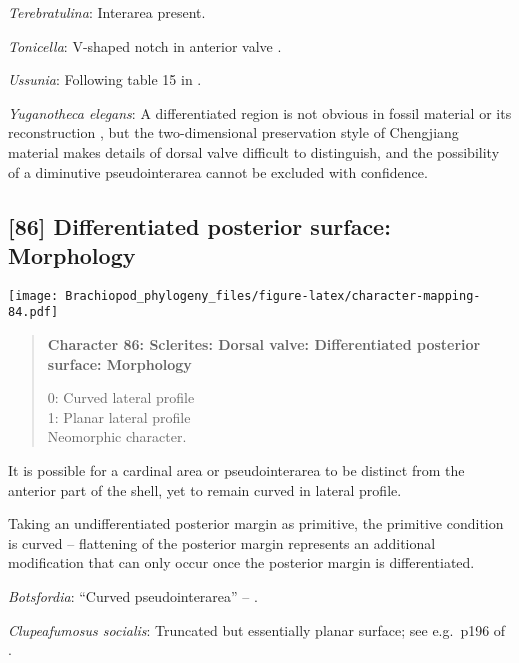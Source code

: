 \documentclass[openany]{book}
\theoremstyle{definition}
\theoremstyle{definition}
\theoremstyle{definition}
\theoremstyle{remark}
\begin{document}
\hypertarget{Terebratulina-coding-85}{}
\emph{Terebratulina}: Interarea present.

\hypertarget{Tonicella-coding-85}{}
\emph{Tonicella}: V-shaped notch in anterior valve \citep{Schwabe2010}.

\hypertarget{Ussunia-coding-85}{}
\emph{Ussunia}: Following table 15 in
\citet{Williams2000LinguliformeaCraniiformea}.

\hypertarget{Yuganotheca_elegans-coding-85}{}
\emph{Yuganotheca elegans}: A differentiated region is not obvious in
fossil material or its reconstruction \citep{Zhang2014Anearly}, but the
two-dimensional preservation style of Chengjiang material makes details
of dorsal valve difficult to distinguish, and the possibility of a
diminutive pseudointerarea cannot be excluded with confidence.

\subsection*{{[}86{]} Differentiated posterior surface:
Morphology}\label{differentiated-posterior-surface-morphology}

\texttt{[image: Brachiopod\_phylogeny\_files/figure-latex/character-mapping-84.pdf]}

\begin{quote}
\textbf{Character 86: Sclerites: Dorsal valve: Differentiated posterior
surface: Morphology}

0: Curved lateral profile\\
1: Planar lateral profile\\
Neomorphic character.
\end{quote}

It is possible for a cardinal area or pseudointerarea to be distinct
from the anterior part of the shell, yet to remain curved in lateral
profile.

Taking an undifferentiated posterior margin as primitive, the primitive
condition is curved -- flattening of the posterior margin represents an
additional modification that can only occur once the posterior margin is
differentiated.

\hypertarget{Botsfordia-coding-86}{}
\emph{Botsfordia}: ``Curved pseudointerarea'' --
\citet{Skovsted2017Depthrelated}.

\hypertarget{Clupeafumosus_socialis-coding-86}{}
\emph{Clupeafumosus socialis}: Truncated but essentially planar surface;
see e.g.~p196 of \citet{Topper2013Reappraisalof}.
\end{document}
